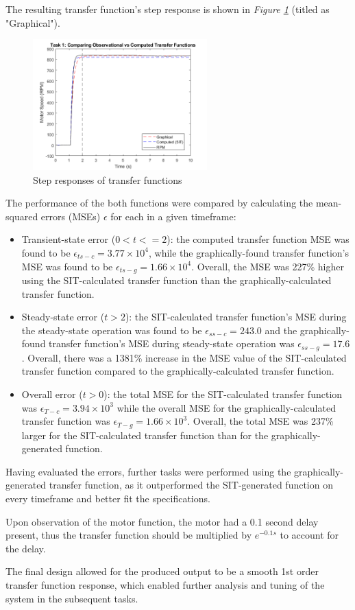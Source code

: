 \documentclass[11pt, onecolumn]{article}
\begin{document}
\par The resulting transfer function's step response is shown in \textit{Figure \ref{fig:q1-graph}} (titled as "Graphical").
\begin{figure}[h!]
    \centering
    \includegraphics[width=0.6\textwidth]{q1-graphs.png}
    \caption{Step responses of transfer functions }
    \label{fig:q1-graph}
\end{figure}
\par The performance of the both functions were compared by calculating the mean-squared errors (MSEs) $\epsilon$ for each in a given timeframe:
\begin{itemize}
    \item Transient-state error ($0 < t <= 2$): the computed transfer function MSE was found to be $\epsilon_{ts-c} = 3.77 \times 10^4$, while the graphically-found transfer function's MSE was found to be $\epsilon_{ts-g} = 1.66 \times 10^4$. Overall, the MSE was 227\% higher using the SIT-calculated transfer function than the graphically-calculated transfer function.
    \item Steady-state error ($t > 2$): the SIT-calculated transfer function's MSE during the steady-state operation was found to be $\epsilon_{ss-c} = 243.0$ and the graphically-found transfer function's MSE during steady-state operation was $\epsilon_{ss-g} = 17.6$. Overall, there was a 1381\% increase in the MSE value of the SIT-calculated transfer function compared to the graphically-calculated transfer function.
    \item Overall error ($t > 0$): the total MSE for the SIT-calculated transfer function was $\epsilon_{T-c}=3.94\times10^{3}$ while the overall MSE for the graphically-calculated transfer function was $\epsilon_{T-g}=1.66\times10^{3}$. Overall, the total MSE was 237\% larger for the SIT-calculated transfer function than for the graphically-generated function.
\end{itemize}
\par Having evaluated the errors, further tasks were performed using the graphically-generated transfer function, as it outperformed the SIT-generated function on every timeframe and better fit the specifications.
\par Upon observation of the motor function, the motor had a 0.1 second delay present, thus the transfer function should be multiplied by $e^{-0.1s}$ to account for the delay.
\par The final design allowed for the produced output to be a smooth 1st order transfer function response, which enabled further analysis and tuning of the system in the subsequent tasks.
\end{document}
